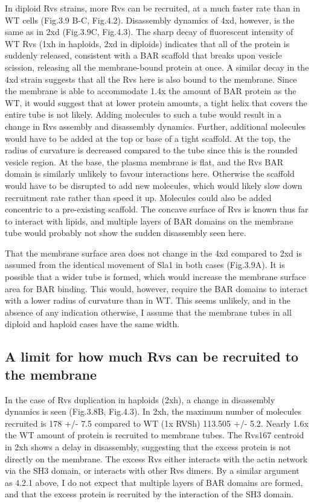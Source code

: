 	\vspace{5mm}
In diploid Rvs strains, more Rvs can be recruited, at a much faster rate than in WT cells (Fig.3.9 B-C, Fig.4.2). Disassembly dynamics of 4xd, however, is the same as in 2xd (Fig.3.9C, Fig.4.3). The sharp decay of fluorescent intensity of WT Rvs (1xh in haploids, 2xd in diploids) indicates that all of the protein is suddenly released, consistent with a BAR scaffold that breaks upon vesicle scission, releasing all the membrane-bound protein at once. A similar decay in the 4xd strain suggests that all the Rvs here is also bound to the membrane. Since the membrane is able to accommodate 1.4x the amount of BAR protein as the WT, it would suggest that at lower protein amounts, a tight helix that covers the entire tube is not likely. Adding molecules to such a tube would result in a change in Rvs assembly and disassembly dynamics. Further, additional molecules would have to be added at the top or base of a tight scaffold. At the top, the radius of curvature is decreased compared to the tube since this is the rounded vesicle region. At the base, the plasma membrane is flat, and the Rvs BAR domain is similarly unlikely to favour interactions here. Otherwise the scaffold would have to be disrupted to add new molecules, which would likely slow down recruitment rate rather than speed it up. Molecules could also be added concentric to a pre-existing scaffold. The concave surface of Rvs is known thus far to interact with lipids, and multiple layers of BAR domains on the membrane tube would probably not show the sudden disassembly seen here.  

	\vspace{5mm}
That the membrane surface area does not change in the 4xd compared to 2xd is assumed from the identical movement of Sla1 in both cases (Fig.3.9A). It is possible that a wider tube is formed, which would increase the membrane surface area for BAR binding. This would, however, require the BAR domains to interact with a lower radius of curvature than in WT. This seems unlikely, and in the absence of any indication otherwise, I assume that the membrane tubes in all diploid and haploid cases have the same width.

\subsection{A limit for how much Rvs can be recruited to the membrane}
In the case of Rvs duplication in haploids (2xh), a change in disassembly dynamics is seen (Fig.3.8B, Fig.4.3). In 2xh, the maximum number of molecules recruited is 178 +/- 7.5 compared to WT (1x RVSh) 113.505 +/- 5.2. Nearly 1.6x the WT amount of protein is recruited to membrane tubes. The Rvs167 centroid in 2xh shows a delay in disassembly, suggesting that the excess protein is not directly on the membrane. The excess Rvs either interacts with the actin network via the SH3 domain, or interacts with other Rvs dimers. By a similar argument as 4.2.1 above, I do not expect that multiple layers of BAR domains are formed, and that the excess protein is recruited by the interaction of the SH3 domain.   

